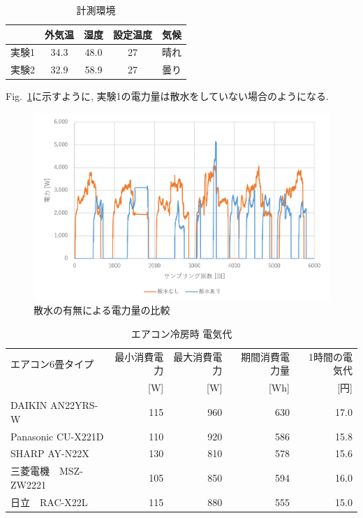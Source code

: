 \documentclass[a4j,fleqn,dvipdfmx,uplatex]{jsarticle}
\newcommand{\figref}[1]{Fig.\ \ref{#1}}
\begin{document}
\begin{table}[tbh]
  \caption{計測環境}
  \label{table:ex1}
  \centering
  \begin{tabular}{lcccc}
     & 外気温 & 湿度 & 設定温度 & 気候 \\
    \hline \hline
    実験1 & 34.3 & 48.0 & 27 & 晴れ  \\
    実験2 & 32.9 & 58.9 & 27 & 曇り \\
    \hline
  \end{tabular}
\end{table}

\figref{fig1:compare_watering}に示すように, 実験1の電力量は散水をしていない場合のようになる. 

\begin{figure}[tb]
  \centering
      \includegraphics[width=0.9\linewidth]{img/ex1.png}
      \caption{散水の有無による電力量の比較}
      \label{fig1:compare_watering}
\end{figure}


\begin{table}[tbh]
  \caption{エアコン冷房時 電気代}
  \label{table:aircon}
  \centering
  \begin{tabular}{lrrrr}
    エアコン6畳タイプ & 最小消費電力 & 最大消費電力 & 期間消費電力量 & 1時間の電気代 \\
     & [W] & [W] & [Wh] & [円] \\
    \hline \hline
    DAIKIN AN22YRS-W & 115 & 960 & 630 & 17.0 \\
    Panasonic CU-X221D & 110 & 920 & 586 & 15.8 \\
    SHARP AY-N22X & 130 & 810 & 578 & 15.6 \\
    三菱電機　MSZ-ZW2221 & 105 & 850 & 594 & 16.0 \\
    日立　RAC-X22L & 115 & 880 & 555 & 15.0 \\
    \hline
  \end{tabular}
\end{table}
\end{document}
